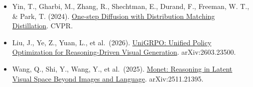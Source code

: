 \begin{itemize}
\item
  Yin, T., Gharbi, M., Zhang, R., Shechtman, E., Durand, F., Freeman, W. T., \& Park, T. (2024). \href{https://arxiv.org/abs/2311.18828}{One-step Diffusion with Distribution Matching Distillation}. CVPR.
\item
  Liu, J., Ye, Z., Yuan, L., et al.~(2026). \href{https://arxiv.org/abs/2603.23500}{UniGRPO: Unified Policy Optimization for Reasoning-Driven Visual Generation}. arXiv:2603.23500.
\item
  Wang, Q., Shi, Y., Wang, Y., et al.~(2025). \href{https://arxiv.org/abs/2511.21395}{Monet: Reasoning in Latent Visual Space Beyond Images and Language}. arXiv:2511.21395.
\end{itemize}

\clearpage
